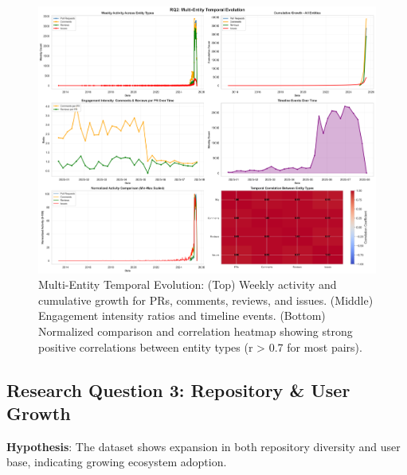 \documentclass[11pt]{article}
\begin{document}
\begin{figure}[H]
\centering
\includegraphics[width=\textwidth]{figures/temporal_02_multi_entity_evolution.png}
\caption{Multi-Entity Temporal Evolution: (Top) Weekly activity and cumulative growth for PRs, comments, reviews, and issues. (Middle) Engagement intensity ratios and timeline events. (Bottom) Normalized comparison and correlation heatmap showing strong positive correlations between entity types (r > 0.7 for most pairs).}
\label{fig:temporal_multi}
\end{figure}

\subsection{Research Question 3: Repository \& User Growth}

\textbf{Hypothesis}: The dataset shows expansion in both repository diversity and user base, indicating growing ecosystem adoption.
\end{document}
